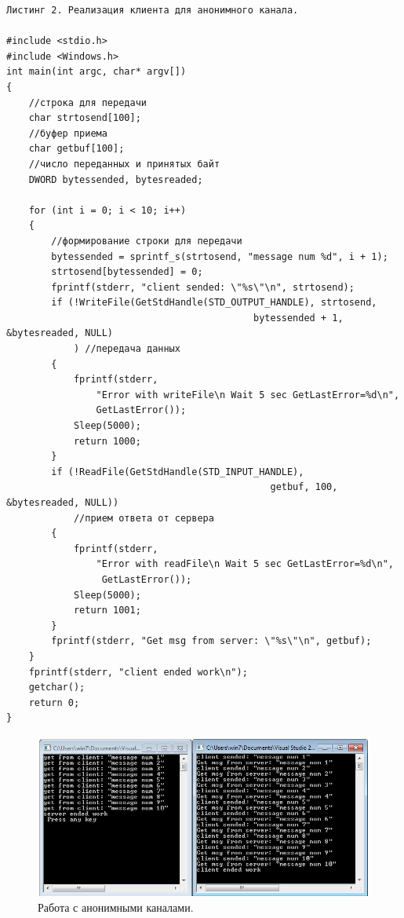\documentclass[a4paper,12pt]{article} %
\begin{document}
\begin{verbatim}
Листинг 2. Реализация клиента для анонимного канала.

#include <stdio.h>
#include <Windows.h>
int main(int argc, char* argv[])
{
    //строка для передачи
    char strtosend[100];
    //буфер приема
    char getbuf[100];
    //число переданных и принятых байт
    DWORD bytessended, bytesreaded;
    
    for (int i = 0; i < 10; i++)
    {
        //формирование строки для передачи
        bytessended = sprintf_s(strtosend, "message num %d", i + 1);
        strtosend[bytessended] = 0;
        fprintf(stderr, "client sended: \"%s\"\n", strtosend);
        if (!WriteFile(GetStdHandle(STD_OUTPUT_HANDLE), strtosend,
                                            bytessended + 1, &bytesreaded, NULL)
            ) //передача данных
        {
            fprintf(stderr, 
                "Error with writeFile\n Wait 5 sec GetLastError=%d\n",
                GetLastError());
            Sleep(5000);
            return 1000;
        }
        if (!ReadFile(GetStdHandle(STD_INPUT_HANDLE),
                                               getbuf, 100, &bytesreaded, NULL))
            //прием ответа от сервера
        {
            fprintf(stderr,
                "Error with readFile\n Wait 5 sec GetLastError=%d\n",
                 GetLastError());
            Sleep(5000);
            return 1001;
        }
        fprintf(stderr, "Get msg from server: \"%s\"\n", getbuf);
    }
    fprintf(stderr, "client ended work\n");
    getchar();
    return 0;
}
\end{verbatim}

\begin{figure}[h!]
\centering
\includegraphics[scale=0.95]{img/02_anonymous_channels}
\caption{Работа с анонимными каналами.}
\end{figure}

\newpage
\end{document}
